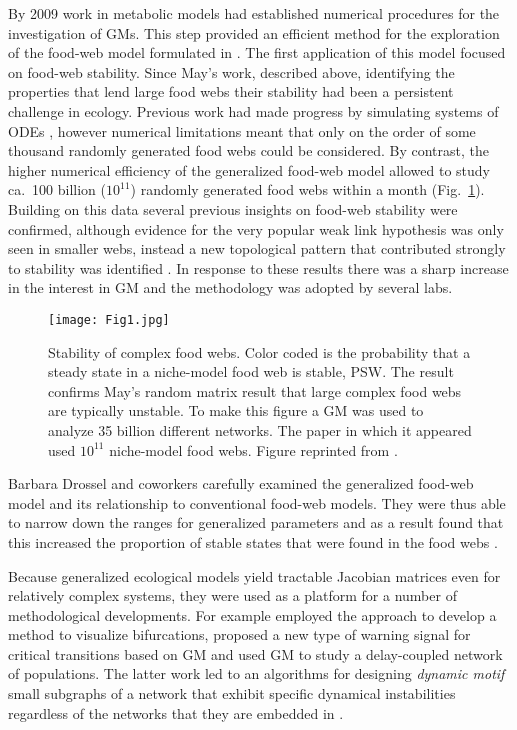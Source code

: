 \documentclass{article}
\begin{document}
By 2009 work in metabolic models \citep{Steuer2006PNAS} had established numerical procedures for the investigation of GMs. This step provided an efficient method for the exploration of the food-web model formulated in \citet{Gross2006PRE}. The first application of this model focused on food-web stability. Since May's work, described above, identifying the properties that lend large food webs their stability had been a persistent challenge in ecology. Previous work had made progress by simulating systems of ODEs \citep{Williams2004EPJ,McCann2005EcolLett,Brose2006EcolLett,neutel2002stability}, however numerical limitations meant that only on the order of some thousand randomly generated food webs could be considered. By contrast, the higher numerical efficiency of the generalized food-web model allowed to study ca.~100 billion ($10^{11}$) randomly generated food webs within a month (Fig.~\ref{figLarsplot}). Building on this data several previous insights on food-web stability were confirmed, although evidence for the very popular weak link hypothesis \citep{McCann1998Nature} was only seen in smaller webs, instead a new topological pattern that contributed strongly to stability was identified \citep{Gross2009Science}. In response to these results there was a sharp increase in the interest in GM and the methodology was adopted by several labs.  

\begin{figure}[ht]
    \centering
    \texttt{[image: Fig1.jpg]} 
    \caption{Stability of complex food webs. Color coded is the probability that a steady state in a niche-model \citep{williams2000simple} food web is stable, PSW. The result confirms May's random matrix result that large complex food webs are typically unstable. To make this figure a GM was used to analyze 35 billion different networks. The paper in which it appeared used $10^{11}$ niche-model food webs. Figure reprinted from \cite{Gross2009Science}.}
    \label{figLarsplot}
\end{figure}

Barbara Drossel and coworkers carefully examined the generalized food-web model and its relationship to conventional food-web models. They were thus able to narrow down the ranges for generalized parameters and as a result found that this increased the proportion of stable states that were found in the food webs \citep{Plitzko2012JTB}.

Because generalized ecological models yield tractable Jacobian matrices even for relatively complex systems, they were used as a platform for a number of methodological developments. For example \citet{Stiefs2008IJBC} employed the approach to develop a method to visualize bifurcations, \citet{Lade2012PLOS} proposed a new type of warning signal for critical transitions based on GM and \citet{Hoefener2011EPL,Hoefener2012PTRS} used GM to study a delay-coupled network of populations. The latter work led to an algorithms for designing \emph{dynamic motif} small subgraphs of a network that exhibit specific dynamical instabilities regardless of the networks that they are embedded in \citep{Do2012NJP}.  
\end{document}
